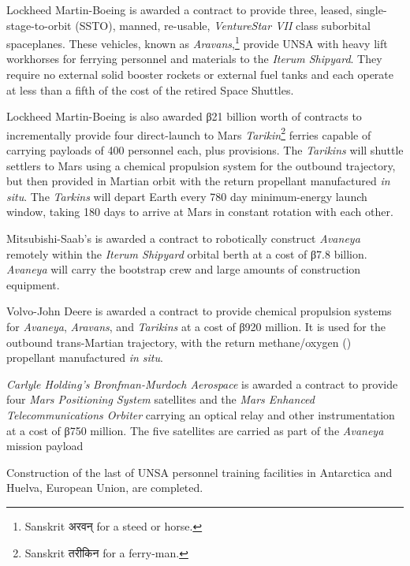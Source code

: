 Lockheed Martin-Boeing is awarded a contract to provide three, leased, single-stage-to-orbit (SSTO), manned, re-usable, {\it VentureStar VII} class suborbital spaceplanes. These vehicles, known as {\it Aravans},\footnote{Sanskrit अरवन् for a steed or horse.} provide UNSA with heavy lift workhorses for ferrying personnel and materials to the {\it Iterum Shipyard}. They require no external solid booster rockets or external fuel tanks and each operate at less than a fifth of the cost of the retired Space Shuttles.

Lockheed Martin-Boeing is also awarded β21 billion worth of contracts to incrementally provide four direct-launch to Mars {\it Tarikin}\footnote{Sanskrit तरीकिन for a ferry-man.} ferries capable of carrying payloads of 400 personnel each, plus provisions. The {\it Tarikins} will shuttle settlers to Mars using a chemical  propulsion system for the outbound trajectory, but then provided in Martian orbit with the return  propellant manufactured {\it in situ}. The {\it Tarkins} will depart Earth every 780 day minimum-energy launch window, taking 180 days to arrive at Mars in constant rotation with each other.

Mitsubishi-Saab's is awarded a contract to robotically construct {\it Avaneya} remotely within the {\it Iterum Shipyard} orbital berth at a cost of β7.8 billion. {\it Avaneya} will carry the bootstrap crew and large amounts of construction equipment.

Volvo-John Deere is awarded a contract to provide chemical propulsion systems for {\it Avaneya}, {\it Aravans}, and {\it Tarikins} at a cost of β920 million. It is used for the outbound trans-Martian trajectory, with the return methane/oxygen () propellant manufactured {\it in situ}.

{\it Carlyle Holding's} {\it Bronfman-Murdoch Aerospace} is awarded a contract to provide four {\it Mars Positioning System} satellites and the {\it Mars Enhanced Telecommunications Orbiter} carrying an optical relay and other instrumentation at a cost of β750 million. The five satellites are carried as part of the {\it Avaneya} mission payload
\StopTimelineDate

Construction of the last of UNSA personnel training facilities in Antarctica and Huelva, European Union, are completed.
\StopTimelineDate

